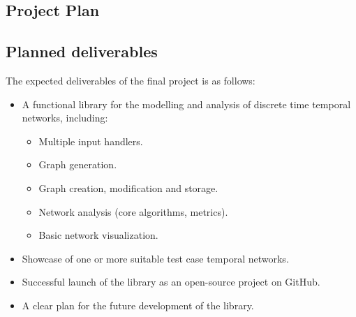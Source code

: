 \begin{plan}
\section{Project Plan}
\subsection{Planned deliverables}
The expected deliverables of the final project is as follows:
\begin{itemize}
  \item A functional library for the modelling and analysis of discrete time temporal networks, including:
  \begin{itemize}
      \item Multiple input handlers.
      \item Graph generation.
      \item Graph creation, modification and storage.
      \item Network analysis (core algorithms, metrics).
      \item Basic network visualization.
  \end{itemize}
  \item Showcase of one or more suitable test case temporal networks.
  \item Successful launch of the library as an open-source project on GitHub.
  \item A clear plan for the future development of the library.
\end{itemize}

\end{plan}
